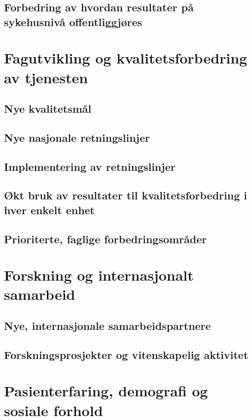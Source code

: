 \documentclass[norsk, a4paper, twocolumn]{report}
\begin{document}
\section{Forbedring av hvordan resultater på sykehusnivå offentliggjøres}
\fyll

\chapter{Fagutvikling og kvalitetsforbedring av tjenesten}
\fyll

\section{Nye kvalitetsmål}
\fyll

\section{Nye nasjonale retningslinjer}
\fyll

\section{Implementering av retningslinjer}
\fyll

\section{Økt bruk av resultater til kvalitetsforbedring i hver enkelt enhet}
\fyll

\section{Prioriterte, faglige forbedringsområder}
\fyll

\chapter{Forskning og internasjonalt samarbeid}
\fyll

\section{Nye, internasjonale samarbeidspartnere}
\fyll

\section{Forskningsprosjekter og vitenskapelig aktivitet}
\fyll

\chapter{Pasienterfaring, demografi og sosiale forhold}
\fyll
\end{document}
